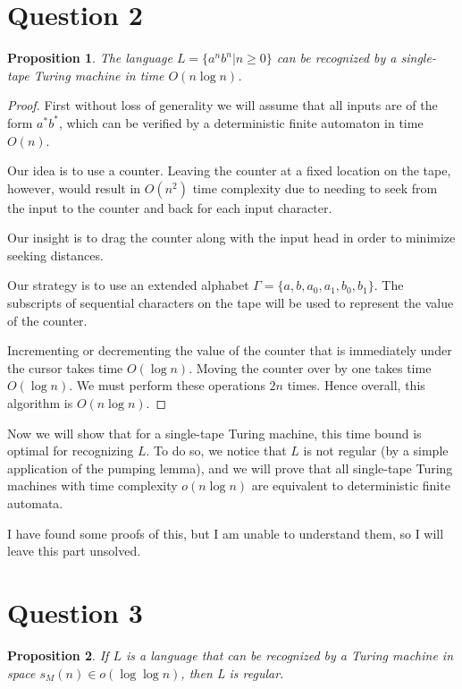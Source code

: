 \documentclass[11pt,letterpaper]{article}
\newtheorem{proposition}{Proposition}
\begin{document}
\section*{Question 2}

\begin{proposition}
    The language $L = \{ a^n b^n | n \geq 0\}$ can be recognized by a
    single-tape Turing machine in time $O(n \log n)$.
\end{proposition}

\begin{proof}
    First without loss of generality we will assume that all inputs are of the
    form $a^* b^*$, which can be verified by a deterministic finite automaton
    in time $O(n)$.

    Our idea is to use a counter. Leaving the counter at a fixed location on
    the tape, however, would result in $O(n^2)$ time complexity due to needing
    to seek from the input to the counter and back for each input character.

    Our insight is to drag the counter along with the input head in order to
    minimize seeking distances.

    Our strategy is to use an extended alphabet
    $\Gamma = \{a, b, a_0, a_1, b_0, b_1\}$.
    The subscripts of sequential characters on the tape will be used to
    represent the value of the counter.

    Incrementing or decrementing the value of the counter that is immediately
    under the cursor takes time $O(\log n)$. Moving the counter over by one
    takes time $O(\log n)$. We must perform these operations $2n$ times. Hence
    overall, this algorithm is $O(n \log n)$.
\end{proof}

Now we will show that for a single-tape Turing machine, this time bound is
optimal for recognizing $L$. To do so, we notice that $L$ is not regular (by a
simple application of the pumping lemma), and we will prove that all
single-tape Turing machines with time complexity $o(n \log n)$ are equivalent
to deterministic finite automata.

I have found some proofs of this, but I am unable to understand them, so I will
leave this part unsolved.

\section*{Question 3}

\begin{proposition}
    If $L$ is a language that can be recognized by a Turing machine in space
    $s_M(n) \in o(\log \log n)$, then L is regular.
\end{proposition}
\end{document}
